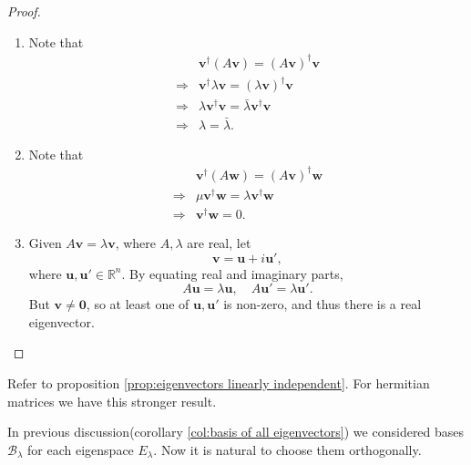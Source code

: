 \documentclass[a4paper]{article}
\begin{document}
    \begin{proof}
      \begin{enumerate}
        \item Note that
          \begin{align*}
            & \mathbf{v}^\dagger (A\mathbf{v})=(A\mathbf{v})^\dagger
            \mathbf{v}\\
            \Longrightarrow & \mathbf{v}^\dagger \lambda\mathbf{v} =
            (\lambda\mathbf{v})^\dagger \mathbf{v}\\
            \Longrightarrow & \lambda\mathbf{v}^\dagger
            \mathbf{v}=\bar{\lambda}\mathbf{v}^\dagger \mathbf{v}\\
            \Longrightarrow & \lambda=\bar{\lambda}.
          \end{align*}
        \item Note that
          \begin{align*}
            &\mathbf{v}^\dagger (A\mathbf{w}) = (A\mathbf{v})^\dagger
            \mathbf{w}\\
            \Longrightarrow & \mu \mathbf{v}^\dagger \mathbf{w} =
            \lambda \mathbf{v}^\dagger \mathbf{w}\\
            \Longrightarrow & \mathbf{v}^\dagger \mathbf{w}=0.
          \end{align*}
        \item Given $ A\mathbf{v}=\lambda\mathbf{v} $, where
          $A,\lambda$ are real, let
          \[
            \mathbf{v}=\mathbf{u}+i\mathbf{u}',
          \]
          where $ \mathbf{u},\mathbf{u}'\in \mathbb{R}^{n} $. By
          equating real and imaginary parts,
          \[
            A\mathbf{u}=\lambda\mathbf{u},\quad A\mathbf{u}'=\lambda\mathbf{u}'.
          \]
          But $ \mathbf{v}\neq \mathbf{0} $, so at least one of $
          \mathbf{u},\mathbf{u}' $ is non-zero, and thus there is a
          real eigenvector.
      \end{enumerate}
    \end{proof}
    \begin{remark}
      Refer to proposition \ref{prop:eigenvectors linearly
      independent}. For hermitian matrices we have this stronger result.
    \end{remark}
    In previous discussion(corollary \ref{col:basis of all
    eigenvectors}) we considered bases $ \mathcal{B}_{\lambda} $ for
    each eigenspace $ E_\lambda $. Now it is natural to choose them
    orthogonally.
\end{document}
